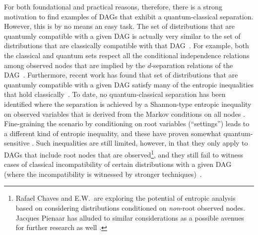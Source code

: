 For both foundational and practical reasons, therefore, there is a strong motivation to find examples of DAGs that exhibit a quantum-classical separation.
However, this is by no means an easy task.
The set of distributions that are quantumly compatible with a given DAG is actually very similar to the set of distributions that are classically compatible with that DAG~\cite{pusey2014gdag,fritz2012bell}. For example, both the classical and quantum sets respect all the conditional independence relations among observed nodes that are implied by the $d$-separation relations of the DAG~\cite{pusey2014gdag}.
Furthermore, recent work has found that set of distributions that are quantumly compatible with a given DAG satisfy many of the entropic inequalities that hold classically~\cite{pusey2014gdag,Chaves2015infoquantum,ChavesNoSignalling}. To date, no quantum-classical separation has been identified where the separation is achieved by
a Shannon-type entropic inequality on observed variables that is derived from the Markov conditions on all nodes \cite{chaves2012entropic,fritz2012bell}. Fine-graining the scenario by conditioning on root variables (``settings'') leads to a different kind of entropic inequality, and these have proven somewhat quantum-sensitive \cite{braunstein1988entropic,SchumacherInequality,chaves2014novel}. Such inequalities are still limited, however, in that they only apply to DAGs that include root nodes that are observed\footnote{Rafael Chaves and E.W.~are exploring the potential of entropic analysis based on considering distributions conditioned on \emph{non}-root observed nodes. Jacques Pienaar has alluded to similar considerations as a possible avenues for further research as well \cite{pianaar2016interesting}.}, and they still fail to witness cases of classical incompatibility of certain distributions with a given DAG (where the incompatibility is witnessed by stronger techniques)~\cite{chaves2014novel,fritz2012bell}.


